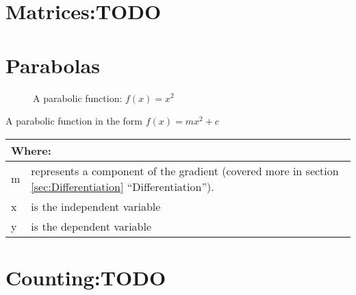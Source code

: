 \section{Matrices:TODO}
\label{sec:Matrices}
\lipsum[1]
\section{Parabolas}
\label{sec:Parabolas}
\begin{figure}[!hbt]
\label{fig:FuncGraphParabola}
\caption{A parabolic function: $f(x) = {x}^{2}$}
\end{figure}
A parabolic function in the form $ f(x) = mx^2 + c$
\begin{table}[!hbt]
\label{tab:PartsOfAParabolicFunction}
\begin{tabularx}{\linewidth}{| l X |}
  \hline
  \multicolumn{2}{|l|}{Where:} \\
  \hline \hline
  m & represents a component of the gradient (covered more in section
  \ref{sec:Differentiation} ``Differentiation''). \\ x & is the independent
  variable\\ y & is the dependent variable\\
\hline
\end{tabularx}
\end{table}
%
%
\section{Counting:TODO}
\label{sec:Counting}
